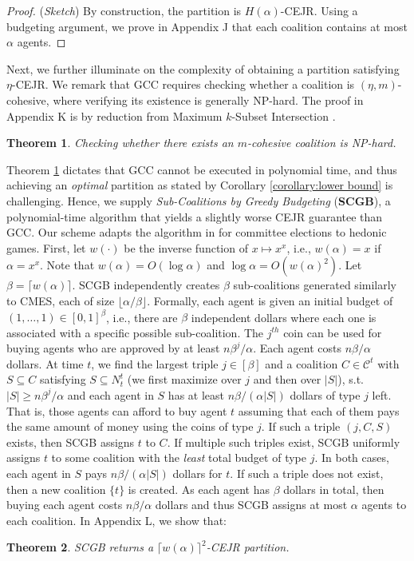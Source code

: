 \documentclass[letterpaper]{article}
\newtheorem{theorem}{Theorem}
\begin{document}
\begin{proof}
(\textit{Sketch})
By construction, the partition is $H(\alpha)$-CEJR. Using a budgeting argument, we prove in Appendix J that each coalition contains at most $\alpha$ agents.
\end{proof}  Next, we further illuminate on the complexity of obtaining a partition satisfying $\eta$-CEJR. We remark that GCC requires checking whether a coalition is $(\eta, m)$-cohesive, where verifying its existence is generally NP-hard. The proof in Appendix K is by reduction from Maximum $k$-Subset Intersection \cite{xavier2012note}.  \begin{theorem}
\label{thm:cohesive np hard}
Checking whether there exists an $m$-cohesive coalition is NP-hard.
\end{theorem}  Theorem \ref{thm:cohesive np hard} dictates that GCC cannot be executed in polynomial time, and thus achieving an \textit{optimal} partition as stated by Corollary \ref{corollary:lower bound} is challenging. Hence, we supply \textit{Sub-Coalitions by Greedy Budgeting} (\textbf{SCGB}), a polynomial-time algorithm that yields a slightly worse CEJR guarantee than GCC. Our scheme adapts the algorithm in \cite[Section 5.3]{do2022online} for committee elections to hedonic games. First, let $w(\cdot)$ be the inverse function of $x \mapsto x^x$, i.e., $w(\alpha) = x$ if $\alpha = x^x$. Note that $w(\alpha) = O(\log \alpha)$ and $\log \alpha = O(w(\alpha)^2)$. Let $\beta = \lceil w(\alpha) \rceil$. SCGB independently creates $\beta$ sub-coalitions generated similarly to CMES, each of size $\lfloor \alpha/\beta \rfloor$. Formally, each agent is given an initial budget of $(1, \dots, 1) \in [0,1]^\beta$, i.e., there are $\beta$ independent dollars where each one is associated with a specific possible sub-coalition. The $j^{th}$ coin can be used for buying agents who are approved by at least $n \beta^j /\alpha$. Each agent costs $n \beta/\alpha$ dollars. At time $t$, we find the largest triple $j \in [\beta]$ and a coalition $C \in \mathcal{C}^t$ with $S \subseteq C$ satisfying $S \subseteq N_t^t$ (we first maximize over $j$ and then over $|S|$), s.t. $|S| \geq n \beta^j /\alpha$ and each agent in $S$ has at least $n\beta /(\alpha |S|)$ dollars of type $j$ left. That is, those agents can afford to buy agent $t$ assuming that each of them pays the same amount of money using the coins of type $j$. If such a triple $(j,C,S)$ exists, then SCGB assigns $t$ to $C$. If multiple such triples exist, SCGB uniformly assigns $t$ to some coalition with the \textit{least} total budget of type $j$. In both cases, each agent in $S$ pays $n\beta /(\alpha |S|)$ dollars for $t$. If such a triple does not exist, then a new coalition $\{t\}$ is created. As each agent has $\beta$ dollars in total, then buying each agent costs $n \beta/\alpha$ dollars and thus SCGB assigns at most $\alpha$ agents to each coalition. In Appendix L, we show that:
\begin{theorem}
\label{thm:scgb}
SCGB returns a $\lceil w(\alpha) \rceil^2$-CEJR partition.
\end{theorem}
\end{document}
